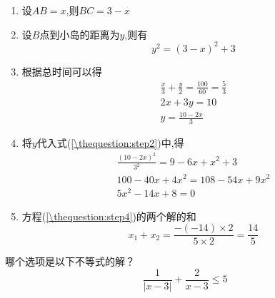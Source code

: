 \documentclass[answers]{exam}
\begin{document}
\begin{questions}
\begin{figure}[ht]
		\caption{\thequestion}
	\end{figure}

	\begin{solution}
		\begin{enumerate}
			\item 设$AB=x$,则$BC=3-x$
			\item 设$B$点到小岛的距离为$y$,则有
			      \begin{equation*}
				      y^2 = (3-x)^2 + 3 \label{\thequestion:step2}
			      \end{equation*}
			\item 根据总时间可以得
			      \begin{gather*}
				      \frac{x}{3} + \frac{y}{2} = \frac{100}{60} = \frac{5}{3}\\
				      2x + 3y = 10 \\
				      y = \frac{10 - 2x}{3}
			      \end{gather*}
			\item 将$y$代入式(\ref{\thequestion:step2})中,得
			      \begin{gather*}
				      \frac{(10-2x)^2}{3^2} = 9 - 6x + x^2 + 3 \\
				      100 -40x + 4x^2 = 108 - 54x + 9x^2 \\
				      5x^2 -14x + 8 = 0 \label{\thequestion:step4}
			      \end{gather*}
			\item 方程(\ref{\thequestion:step4})的两个解的和
			      \begin{equation*}
				      x_1 + x_2 = \frac{-(-14) \times 2}{5 \times 2} = \frac{14}{5}
			      \end{equation*}
		\end{enumerate}
	\end{solution}

	\question 哪个选项是以下不等式的解？
	\begin{equation*}
		\dfrac{1}{|x-3|} + \dfrac{2}{x-3} \le 5
	\end{equation*}


\end{questions}
\end{document}
